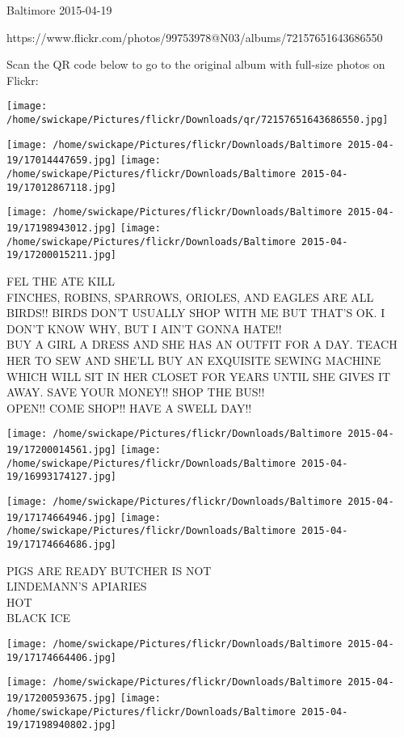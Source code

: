 \documentclass[10pt,letterpaper]{article}
\begin{document}
Baltimore 2015-04-19

https://www.flickr.com/photos/99753978@N03/albums/72157651643686550

Scan the QR code below to go to the original album with full-size photos on Flickr:

\texttt{[image: /home/swickape/Pictures/flickr/Downloads/qr/72157651643686550.jpg]}
\pagebreak

\texttt{[image: /home/swickape/Pictures/flickr/Downloads/Baltimore 2015-04-19/17014447659.jpg]}
\texttt{[image: /home/swickape/Pictures/flickr/Downloads/Baltimore 2015-04-19/17012867118.jpg]}

\texttt{[image: /home/swickape/Pictures/flickr/Downloads/Baltimore 2015-04-19/17198943012.jpg]}
\texttt{[image: /home/swickape/Pictures/flickr/Downloads/Baltimore 2015-04-19/17200015211.jpg]}

FEL THE ATE KILL\\
FINCHES, ROBINS, SPARROWS, ORIOLES, AND EAGLES ARE ALL BIRDS!!  BIRDS DON'T USUALLY SHOP WITH ME BUT THAT'S OK.  I DON'T KNOW WHY, BUT I AIN'T GONNA HATE!!\\
BUY A GIRL A DRESS AND SHE HAS AN OUTFIT FOR A DAY.  TEACH HER TO SEW AND SHE'LL BUY AN EXQUISITE SEWING MACHINE WHICH WILL SIT IN HER CLOSET FOR YEARS UNTIL SHE GIVES IT AWAY.  SAVE YOUR MONEY!! SHOP THE BUS!!\\
OPEN!! COME SHOP!! HAVE A SWELL DAY!!\\
\pagebreak

\texttt{[image: /home/swickape/Pictures/flickr/Downloads/Baltimore 2015-04-19/17200014561.jpg]}
\texttt{[image: /home/swickape/Pictures/flickr/Downloads/Baltimore 2015-04-19/16993174127.jpg]}

\texttt{[image: /home/swickape/Pictures/flickr/Downloads/Baltimore 2015-04-19/17174664946.jpg]}
\texttt{[image: /home/swickape/Pictures/flickr/Downloads/Baltimore 2015-04-19/17174664686.jpg]}

PIGS ARE READY BUTCHER IS NOT\\
LINDEMANN'S APIARIES\\
HOT\\
BLACK ICE\\
\pagebreak

\texttt{[image: /home/swickape/Pictures/flickr/Downloads/Baltimore 2015-04-19/17174664406.jpg]}

\vspace{0.25in}
\texttt{[image: /home/swickape/Pictures/flickr/Downloads/Baltimore 2015-04-19/17200593675.jpg]}
\texttt{[image: /home/swickape/Pictures/flickr/Downloads/Baltimore 2015-04-19/17198940802.jpg]}
\end{document}
